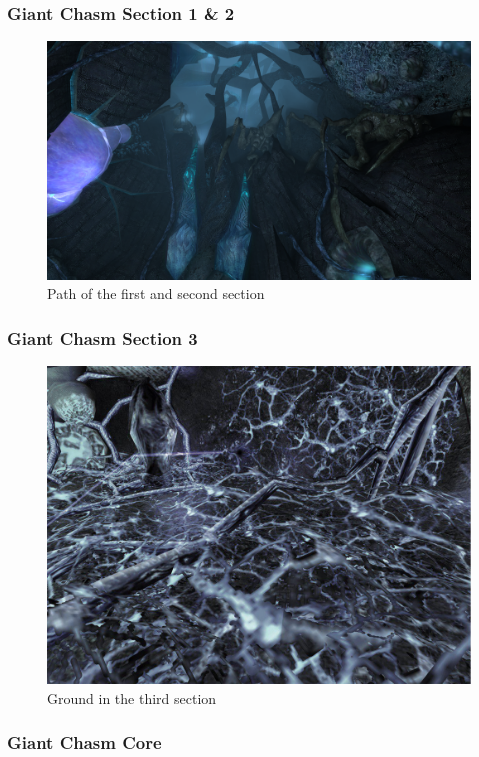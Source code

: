 \subsubsection{Giant Chasm Section 1 \& 2}

\vspace*{0.3cm}
\begin{figure}[H]
	\centering
	\includegraphics[width=0.8\linewidth]{images/visual_ref/15_giant_chasm/chasm_section_1_2.png}
	\caption*{Path of the first and second section}
\end{figure}

\subsubsection{Giant Chasm Section 3}

\vspace*{0.3cm}
\begin{figure}[H]
	\centering
	\includegraphics[width=0.8\linewidth]{images/visual_ref/15_giant_chasm/chasm_section_3.jpg}
	\caption*{Ground in the third section}
\end{figure}

\subsubsection{Giant Chasm Core}

